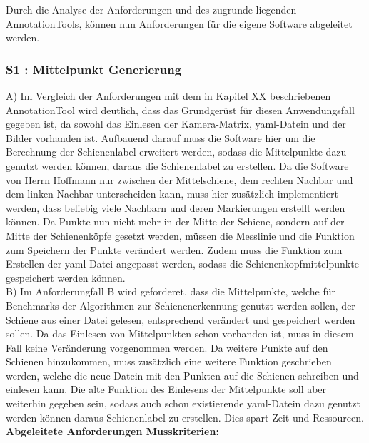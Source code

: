 \documentclass[11pt]{scrartcl}
\begin{document}
Durch die Analyse der Anforderungen und des zugrunde liegenden AnnotationTools, können nun Anforderungen für die eigene Software abgeleitet werden.

\subsubsection{S1 : Mittelpunkt Generierung} 
\label{sec:S1 : Mittelpunkt Generierung}

A)
\noindent
Im Vergleich der Anforderungen mit dem in Kapitel XX beschriebenen AnnotationTool wird deutlich, dass das Grundgerüst für diesen Anwendungsfall gegeben ist, da sowohl das Einlesen der Kamera-Matrix, yaml-Datein und der Bilder vorhanden ist. Aufbauend darauf muss die Software hier um die Berechnung der Schienenlabel erweitert werden, sodass die Mittelpunkte dazu genutzt werden können, daraus die Schienenlabel zu erstellen.  Da die Software von Herrn Hoffmann nur zwischen der Mittelschiene, dem rechten Nachbar und dem linken Nachbar unterscheiden kann, muss hier zusätzlich implementiert werden, dass beliebig viele Nachbarn und deren Markierungen erstellt werden können. Da Punkte nun nicht mehr in der Mitte der Schiene, sondern auf der Mitte der Schienenköpfe gesetzt werden, müssen die Messlinie und die Funktion zum Speichern der Punkte verändert werden. Zudem muss die Funktion zum Erstellen der yaml-Datei angepasst werden, sodass die Schienenkopfmittelpunkte gespeichert werden können. 
\\

\noindent
B)
\noindent
Im Anforderungfall B wird geforderet, dass die Mittelpunkte, welche für Benchmarks der Algorithmen zur Schienenerkennung genutzt werden sollen, der Schiene aus einer Datei gelesen, entsprechend verändert und gespeichert werden sollen. Da das Einlesen von Mittelpunkten schon vorhanden ist, muss in diesem Fall keine Veränderung vorgenommen werden. Da weitere Punkte auf den Schienen hinzukommen, muss zusätzlich eine weitere Funktion geschrieben werden, welche die neue Datein mit den Punkten auf die Schienen schreiben und einlesen kann. Die alte Funktion des Einlesens der Mittelpunkte soll aber weiterhin gegeben sein, sodass auch schon existierende yaml-Datein dazu genutzt werden können daraus Schienenlabel zu erstellen. Dies spart Zeit und Ressourcen.
\\

\noindent
\textbf{Abgeleitete Anforderungen Musskriterien:}
\end{document}
